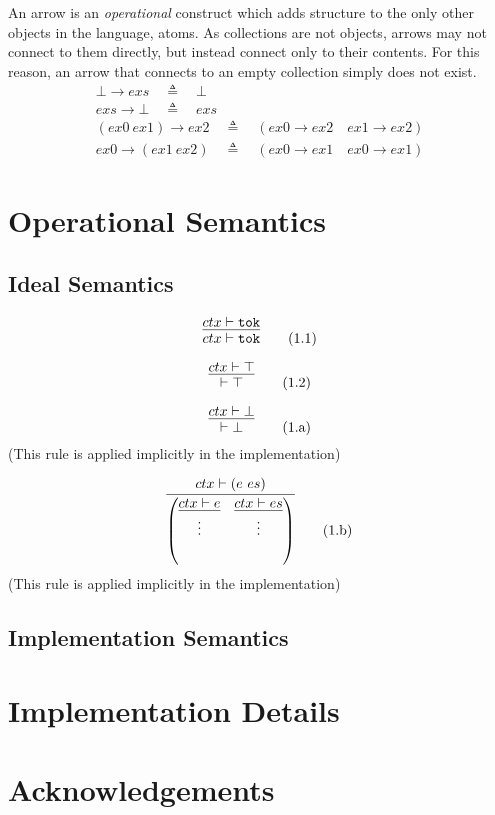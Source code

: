 \documentclass[a4paper,11pt]{article}
\begin{document}
An arrow is an \emph{operational} construct which adds structure to the only other objects in the language, atoms.
As collections are not objects, arrows may not connect to them directly, but instead connect only to their contents.
For this reason, an arrow that connects to an empty collection simply does not exist.
\begin{eqnarray}
\bot \rightarrow exs \quad\triangleq\quad \bot \\
exs \rightarrow \bot \quad\triangleq\quad exs \\
(ex0\ ex1) \rightarrow ex2 \quad\triangleq\quad (ex0 \rightarrow ex2 \quad ex1 \rightarrow ex2) \\
ex0 \rightarrow (ex1\ ex2) \quad\triangleq\quad (ex0 \rightarrow ex1 \quad ex0 \rightarrow ex1)
\end{eqnarray}

\section{Operational Semantics}

\subsection{Ideal Semantics}

\begin{equation}
\infer{ctx \vdash \texttt{tok}}{ctx \vdash \texttt{tok}} \tag{1.1}
\end{equation}

\begin{equation}
\infer{\vdash \top}{ctx \vdash \top} \tag{1.2}
\end{equation}

\begin{equation}
\infer{\vdash \bot}{ctx \vdash \bot} \tag{1.a}
\end{equation}
(This rule is applied implicitly in the implementation)

\begin{equation}
\infer{ \left(\infer{\vdots}{ctx \vdash e}\quad\infer{\vdots}{ctx \vdash es}\right) }{ ctx \vdash (e\ es) } \tag{1.b}
\end{equation}
(This rule is applied implicitly in the implementation)



\subsection{Implementation Semantics}

\section{Implementation Details}

\section*{Acknowledgements}



\end{document}
